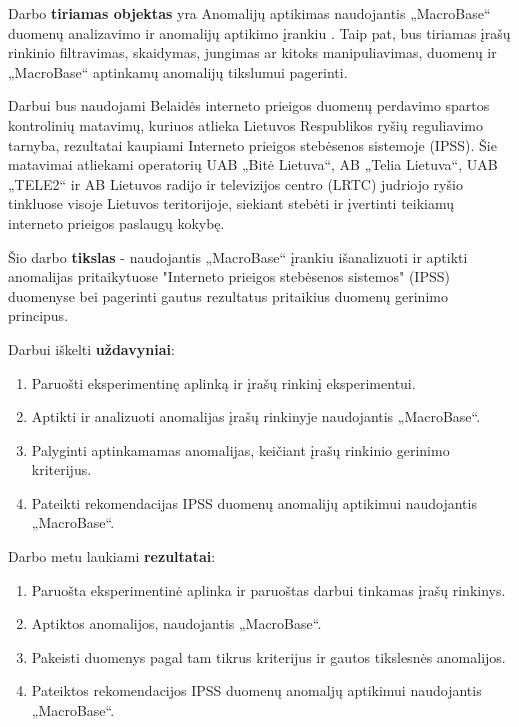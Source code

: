 \documentclass{VUMIFPSbakalaurinis}
\begin{document}
Darbo \textbf{tiriamas objektas} yra Anomalijų aptikimas naudojantis „MacroBase“ duomenų analizavimo ir anomalijų aptikimo įrankiu \cite{macrobase_overview,prioritizing_attention,asap}. Taip pat, bus tiriamas įrašų rinkinio filtravimas, skaidymas, jungimas ar kitoks manipuliavimas, duomenų ir „MacroBase“ aptinkamų anomalijų tikslumui pagerinti. \par

Darbui bus naudojami Belaidės interneto prieigos duomenų perdavimo spartos kontrolinių matavimų, kuriuos atlieka Lietuvos Respublikos ryšių reguliavimo tarnyba, rezultatai kaupiami Interneto prieigos stebėsenos sistemoje (IPSS). Šie matavimai atliekami operatorių UAB „Bitė Lietuva“, AB „Telia Lietuva“, UAB „TELE2“ ir AB Lietuvos radijo ir televizijos centro (LRTC) judriojo ryšio tinkluose visoje Lietuvos teritorijoje, siekiant stebėti ir įvertinti teikiamų interneto prieigos paslaugų kokybę.\cite{dataset} \par


Šio darbo \textbf{tikslas} - naudojantis „MacroBase“  įrankiu išanalizuoti ir aptikti anomalijas pritaikytuose "Interneto prieigos stebėsenos sistemos" (IPSS) duomenyse bei pagerinti gautus rezultatus pritaikius duomenų gerinimo principus.\par

Darbui iškelti \textbf{uždavyniai}:\par

\begin{enumerate}
	\item Paruošti eksperimentinę aplinką ir įrašų rinkinį eksperimentui.
	\item Aptikti ir analizuoti anomalijas įrašų rinkinyje naudojantis „MacroBase“.
	\item Palyginti aptinkamamas anomalijas, keičiant įrašų rinkinio gerinimo kriterijus.
	\item Pateikti rekomendacijas IPSS duomenų anomalijų aptikimui naudojantis „MacroBase“.
\end{enumerate}

Darbo metu laukiami \textbf{rezultatai}:

\begin{enumerate}
	\item Paruošta eksperimentinė aplinka ir paruoštas darbui tinkamas įrašų rinkinys.
	\item Aptiktos anomalijos, naudojantis „MacroBase“.
	\item Pakeisti duomenys pagal tam tikrus kriterijus ir gautos tikslesnės anomalijos.
	\item Pateiktos rekomendacijos IPSS duomenų anomaljų aptikimui naudojantis „MacroBase“.
\end{enumerate}
\end{document}
